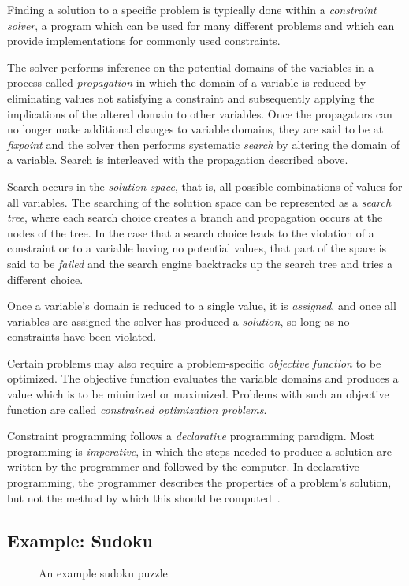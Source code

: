 \documentclass[a4paper,10pt,twoside,openright]{book}
\begin{document}
Finding a solution to a specific problem is typically done within a \textit{constraint solver}, a program which can be used for many different problems and which can provide implementations for commonly used constraints.

The solver performs inference on the potential domains of the variables in a process called \textit{propagation} in which the domain of a variable is reduced by eliminating values not satisfying a constraint and subsequently applying the implications of the altered domain to other variables.  
Once the propagators can no longer make additional changes to variable domains, they are said to be at \textit{fixpoint} and the solver then performs systematic \textit{search} by altering the domain of a variable. Search is interleaved with the propagation described above.

Search occurs in the \textit{solution space}, that is, all possible combinations of values for all variables. 
The searching of the solution space can be represented as a \textit{search tree}, where each search choice creates a branch and propagation occurs at the nodes of the tree.
In the case that a search choice leads to the violation of a constraint or to a variable having no potential values, that part of the space is said to be \textit{failed} and the search engine backtracks up the search tree and tries a different choice. 

Once a variable's domain is reduced to a single value, it is \textit{assigned}, and once all variables are assigned the solver has produced a \textit{solution}, so long as no constraints have been violated.

Certain problems may also require a problem-specific \textit{objective function} to be optimized. The objective function evaluates the variable domains and produces a value which is to be minimized or maximized. Problems with such an objective function are called \textit{constrained optimization problems}.

Constraint programming follows a \textit{declarative} programming paradigm. Most programming is \textit{imperative}, in which the steps needed to produce a solution are written by the programmer and followed by the computer. In declarative programming, the programmer describes the properties of a problem's solution, but not the method by which this should be computed~\cite{declarative}.

\subsection{Example: Sudoku}
\begin{figure}
    \centering
    
    \caption{An example sudoku puzzle}
    \label{fig:sudoku}
\end{figure}
\end{document}
